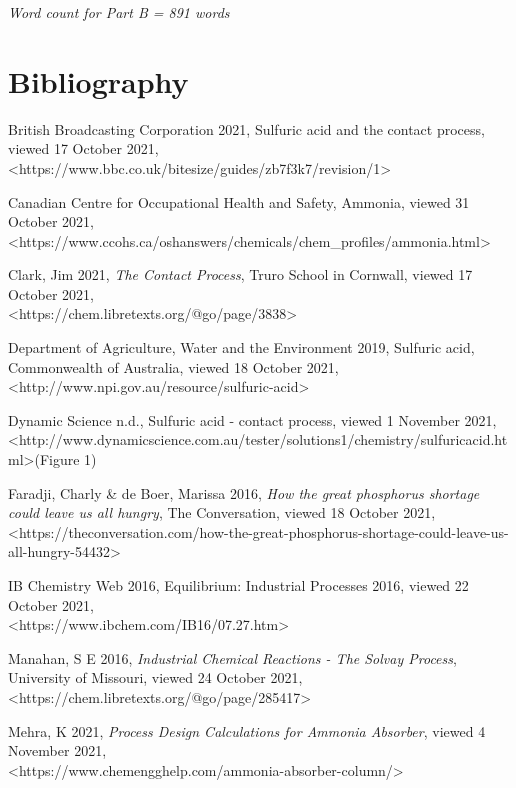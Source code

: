 \documentclass[12pt, a4paper]{article}
\begin{document}
\emph{Word count for Part B = 891 words}

\pagebreak

\section{Bibliography}

British Broadcasting Corporation 2021, Sulfuric acid and the contact process, viewed 17 October 2021, \\ \textless{https://www.bbc.co.uk/bitesize/guides/zb7f3k7/revision/1}\textgreater

Canadian Centre for Occupational Health and Safety, Ammonia, viewed 31 October 2021, \\ \textless{https://www.ccohs.ca/oshanswers/chemicals/chem\_profiles/ammonia.html}\textgreater

Clark, Jim 2021, \emph{The Contact Process}, Truro School in Cornwall, viewed 17 October 2021, \\ \textless{https://chem.libretexts.org/@go/page/3838}\textgreater

Department of Agriculture, Water and the Environment 2019, Sulfuric acid, Commonwealth of Australia, viewed 18 October 2021, \textless{http://www.npi.gov.au/resource/sulfuric-acid}\textgreater

Dynamic Science n.d., Sulfuric acid - contact process, viewed 1 November 2021, \\ \textless{http://www.dynamicscience.com.au/tester/solutions1/chemistry/sulfuricacid.html}\textgreater (Figure 1)

Faradji, Charly \& de Boer, Marissa 2016, \emph{How the great phosphorus shortage could leave us all hungry}, The Conversation, viewed 18 October 2021, \\ \textless{https://theconversation.com/how-the-great-phosphorus-shortage-could-leave-us-all-hungry-54432}\textgreater

IB Chemistry Web 2016, Equilibrium: Industrial Processes 2016, viewed 22 October 2021, \\ \textless{https://www.ibchem.com/IB16/07.27.htm}\textgreater

Manahan, S E 2016, \emph{Industrial Chemical Reactions - The Solvay Process}, University of Missouri, viewed 24 October 2021, \textless{https://chem.libretexts.org/@go/page/285417}\textgreater

Mehra, K 2021, \emph{Process Design Calculations for Ammonia Absorber}, viewed 4 November 2021, \\ \textless{https://www.chemengghelp.com/ammonia-absorber-column/}\textgreater
\end{document}
